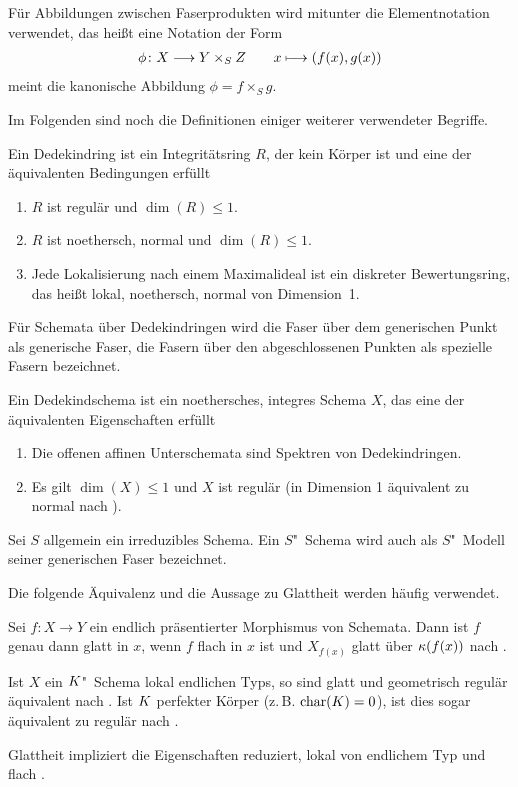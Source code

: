 Für Abbildungen zwischen Faserprodukten wird mitunter die
Elementnotation verwendet, das heißt eine Notation der Form
\begin{gather*}
  \phi\colon X\longto Y\times_S Z\qquad
  x\longmapsto (f(x),g(x))
\end{gather*}
meint die kanonische Abbildung $\phi=f\times_S g$.

Im Folgenden sind noch die Definitionen einiger weiterer verwendeter Begriffe.
\begin{Definition}[Dedekindring]\label{def:dedekindring}
  Ein Dedekindring ist ein Integritätsring $R$, der kein Körper ist
  und eine der äquivalenten Bedingungen erfüllt
  \begin{enumerate}[label=(\roman*)]
  \item $R$ ist regulär und $\dim(R)\leq 1$.
  \item $R$ ist noethersch, normal und $\dim(R)\leq 1$.
  \item Jede Lokalisierung nach einem Maximalideal ist ein diskreter
    Bewertungsring,
    das heißt lokal, noethersch, normal von Dimension~1.
  \end{enumerate}
\end{Definition}
Für Schemata über Dedekindringen wird die Faser über dem
generischen Punkt als generische Faser, die Fasern über den
abgeschlossenen Punkten als spezielle Fasern bezeichnet.
\begin{Definition}[Dedekindschema]
  Ein Dedekindschema ist ein noethersches, integres Schema $X$, das
  eine der äquivalenten Eigenschaften erfüllt
  \begin{enumerate}[label=(\roman*)]
  \item Die offenen affinen Unterschemata sind Spektren von Dedekindringen.
  \item Es gilt $\dim(X)\leq 1$ und $X$ ist regulär
    (in Dimension 1 äquivalent zu normal nach
    \cite[Corollary~6.39, Proposition~6.40]{wedhorn}).
  \end{enumerate}
\end{Definition}
Sei $S$ allgemein ein irreduzibles Schema. Ein $S$"~Schema wird auch als
$S$"~Modell seiner generischen Faser bezeichnet.

Die folgende Äquivalenz und die Aussage zu Glattheit werden häufig
verwendet.
\begin{Bemerkung}\label{thm:eigglatt}
  Sei $f\colon X\to Y$ ein endlich präsentierter Morphismus von Schemata.
  Dann ist $f$ genau dann glatt in $x$, wenn $f$ flach in $x$ ist und
  $X_{f(x)}$ glatt über $\kappa(f(x))$ nach
  \cite[Proposition~8.5/17]{bosch}.
  
  Ist $X$ ein $K$"~Schema lokal endlichen Typs, so sind glatt und
  geometrisch regulär äquivalent nach \cite[Corollary~6.32]{wedhorn}.
  Ist $K$ perfekter Körper (z.\,B. $\operatorname{char}(K)=0$), ist dies sogar
  äquivalent zu regulär nach \cite[Remark~6.33]{wedhorn}.
    
  Glattheit impliziert die Eigenschaften reduziert, lokal von
  endlichem Typ und flach
  \cite[für flach siehe][Theorem~14.22]{wedhorn}.
\end{Bemerkung}

